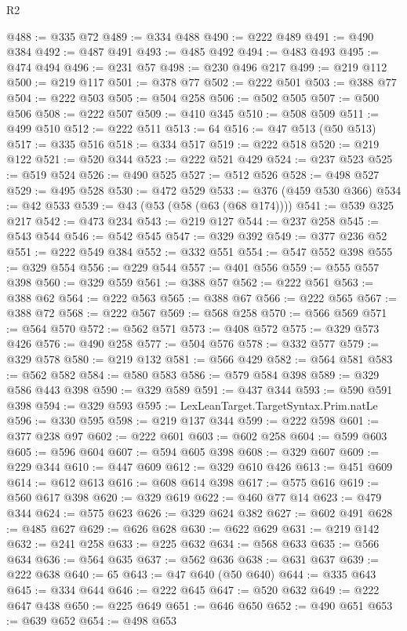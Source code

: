 \begin{lexlean}{R2}
\begin{coremodule}
@488 := @335 @72
@489 := @334 @488
@490 := @222 @489
@491 := @490 @384
@492 := @487 @491
@493 := @485 @492
@494 := @483 @493
@495 := @474 @494
@496 := @231 @57
@498 := @230 @496 @217
@499 := @219 @112
@500 := @219 @117
@501 := @378 @77
@502 := @222 @501
@503 := @388 @77
@504 := @222 @503
@505 := @504 @258
@506 := @502 @505
@507 := @500 @506
@508 := @222 @507
@509 := @410 @345
@510 := @508 @509
@511 := @499 @510
@512 := @222 @511
@513 := 64
@516 := @47 @513 (@50 @513)
@517 := @335 @516
@518 := @334 @517
@519 := @222 @518
@520 := @219 @122
@521 := @520 @344
@523 := @222 @521 @429
@524 := @237 @523
@525 := @519 @524
@526 := @490 @525
@527 := @512 @526
@528 := @498 @527
@529 := @495 @528
@530 := @472 @529
@533 := @376 (@459 @530 @366)
@534 := @42 @533
@539 := @43 (@53 (@58 (@63 (@68 @174))))
@541 := @539 @325 @217
@542 := @473 @234
@543 := @219 @127
@544 := @237 @258
@545 := @543 @544
@546 := @542 @545
@547 := @329 @392
@549 := @377 @236 @52
@551 := @222 @549 @384
@552 := @332 @551
@554 := @547 @552 @398
@555 := @329 @554
@556 := @229 @544
@557 := @401 @556
@559 := @555 @557 @398
@560 := @329 @559
@561 := @388 @57
@562 := @222 @561
@563 := @388 @62
@564 := @222 @563
@565 := @388 @67
@566 := @222 @565
@567 := @388 @72
@568 := @222 @567
@569 := @568 @258
@570 := @566 @569
@571 := @564 @570
@572 := @562 @571
@573 := @408 @572
@575 := @329 @573 @426
@576 := @490 @258
@577 := @504 @576
@578 := @332 @577
@579 := @329 @578
@580 := @219 @132
@581 := @566 @429
@582 := @564 @581
@583 := @562 @582
@584 := @580 @583
@586 := @579 @584 @398
@589 := @329 @586 @443 @398
@590 := @329 @589
@591 := @437 @344
@593 := @590 @591 @398
@594 := @329 @593
@595 := LexLeanTarget.TargetSyntax.Prim.natLe
@596 := @330 @595
@598 := @219 @137 @344
@599 := @222 @598
@601 := @377 @238 @97
@602 := @222 @601
@603 := @602 @258
@604 := @599 @603
@605 := @596 @604
@607 := @594 @605 @398
@608 := @329 @607
@609 := @229 @344
@610 := @447 @609
@612 := @329 @610 @426
@613 := @451 @609
@614 := @612 @613
@616 := @608 @614 @398
@617 := @575 @616
@619 := @560 @617 @398
@620 := @329 @619
@622 := @460 @77 @14
@623 := @479 @344
@624 := @575 @623
@626 := @329 @624 @382
@627 := @602 @491
@628 := @485 @627
@629 := @626 @628
@630 := @622 @629
@631 := @219 @142
@632 := @241 @258
@633 := @225 @632
@634 := @568 @633
@635 := @566 @634
@636 := @564 @635
@637 := @562 @636
@638 := @631 @637
@639 := @222 @638
@640 := 65
@643 := @47 @640 (@50 @640)
@644 := @335 @643
@645 := @334 @644
@646 := @222 @645
@647 := @520 @632
@649 := @222 @647 @438
@650 := @225 @649
@651 := @646 @650
@652 := @490 @651
@653 := @639 @652
@654 := @498 @653

\end{coremodule}
\end{lexlean}
